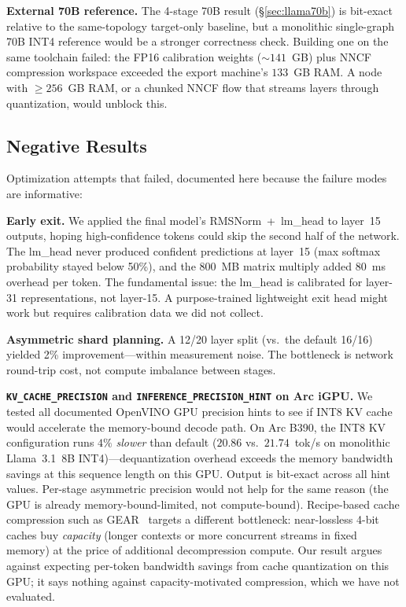 \documentclass[11pt]{article}
\newcommand{\brk}{\discretionary{}{}{}}
\begin{document}
\textbf{External 70B reference.} The 4-stage 70B result (\S\ref{sec:llama70b}) is bit-exact relative to the same-topology target-only baseline, but a monolithic single-graph 70B INT4 reference would be a stronger correctness check. Building one on the same toolchain failed: the FP16 calibration weights ($\sim 141$~GB) plus NNCF compression workspace exceeded the export machine's $133$~GB RAM. A node with $\geq 256$~GB RAM, or a chunked NNCF flow that streams layers through quantization, would unblock this.

\subsection{Negative Results}
\label{sec:negative}

Optimization attempts that failed, documented here because the failure modes are informative:

\textbf{Early exit.} We applied the final model's RMSNorm~+~lm\_head to layer~15 outputs, hoping high-confidence tokens could skip the second half of the network. The lm\_head never produced confident predictions at layer~15 (max softmax probability stayed below 50\%), and the $800$~MB matrix multiply added $80$~ms overhead per token. The fundamental issue: the lm\_head is calibrated for layer-31 representations, not layer-15. A purpose-trained lightweight exit head might work but requires calibration data we did not collect.

\textbf{Asymmetric shard planning.} A 12/20 layer split (vs.\ the default 16/16) yielded 2\% improvement---within measurement noise. The bottleneck is network round-trip cost, not compute imbalance between stages.

\textbf{\texttt{KV\_\brk CACHE\_\brk PRECISION} and \texttt{INFERENCE\_\brk PRECISION\_\brk HINT} on Arc iGPU.} We tested all documented OpenVINO GPU precision hints to see if INT8 KV cache would accelerate the memory-bound decode path. On Arc B390, the INT8 KV configuration runs $4\%$ \emph{slower} than default ($20.86$ vs.\ $21.74$~tok/s on monolithic Llama~3.1~8B INT4)---dequantization overhead exceeds the memory bandwidth savings at this sequence length on this GPU. Output is bit-exact across all hint values. Per-stage asymmetric precision would not help for the same reason (the GPU is already memory-bound-limited, not compute-bound). Recipe-based cache compression such as GEAR~\cite{kang2024gear} targets a different bottleneck: near-lossless 4-bit caches buy \emph{capacity} (longer contexts or more concurrent streams in fixed memory) at the price of additional decompression compute. Our result argues against expecting per-token bandwidth savings from cache quantization on this GPU; it says nothing against capacity-motivated compression, which we have not evaluated.
\end{document}
